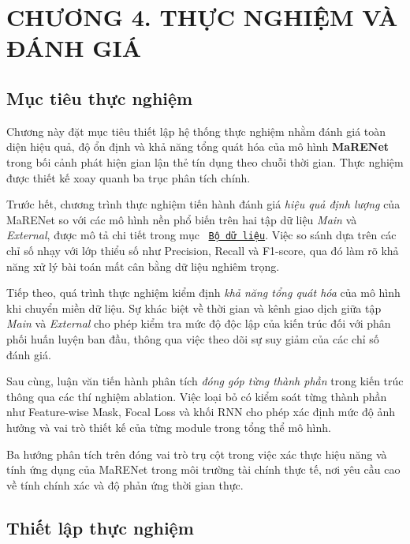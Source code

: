 \newpage
\section*{CHƯƠNG 4. THỰC NGHIỆM VÀ ĐÁNH GIÁ  }


\setcounter{section}{4}
\setcounter{subsection}{0}
\setcounter{figure}{0}
\setcounter{table}{0}

\subsection{Mục tiêu thực nghiệm}

Chương này đặt mục tiêu thiết lập hệ thống thực nghiệm nhằm đánh giá toàn diện hiệu quả, độ ổn định và khả năng tổng quát hóa của mô hình \textbf{MaRENet} trong bối cảnh phát hiện gian lận thẻ tín dụng theo chuỗi thời gian. Thực nghiệm được thiết kế xoay quanh ba trục phân tích chính.

Trước hết, chương trình thực nghiệm tiến hành đánh giá \textit{hiệu quả định lượng} của MaRENet so với các mô hình nền phổ biến trên hai tập dữ liệu \textit{Main} và \textit{External}, được mô tả chi tiết trong mục ~\hyperref[sec:dataset]{\texttt{Bộ dữ liệu}}. Việc so sánh dựa trên các chỉ số nhạy với lớp thiểu số như Precision, Recall và F1-score, qua đó làm rõ khả năng xử lý bài toán mất cân bằng dữ liệu nghiêm trọng.

Tiếp theo, quá trình thực nghiệm kiểm định \textit{khả năng tổng quát hóa} của mô hình khi chuyển miền dữ liệu. Sự khác biệt về thời gian và kênh giao dịch giữa tập \textit{Main} và \textit{External} cho phép kiểm tra mức độ độc lập của kiến trúc đối với phân phối huấn luyện ban đầu, thông qua việc theo dõi sự suy giảm của các chỉ số đánh giá.

Sau cùng, luận văn tiến hành phân tích \textit{đóng góp từng thành phần} trong kiến trúc thông qua các thí nghiệm ablation. Việc loại bỏ có kiểm soát từng thành phần như Feature-wise Mask, Focal Loss và khối RNN cho phép xác định mức độ ảnh hưởng và vai trò thiết kế của từng module trong tổng thể mô hình.

Ba hướng phân tích trên đóng vai trò trụ cột trong việc xác thực hiệu năng và tính ứng dụng của MaRENet trong môi trường tài chính thực tế, nơi yêu cầu cao về tính chính xác và độ phản ứng thời gian thực.

\subsection{Thiết lập thực nghiệm}

